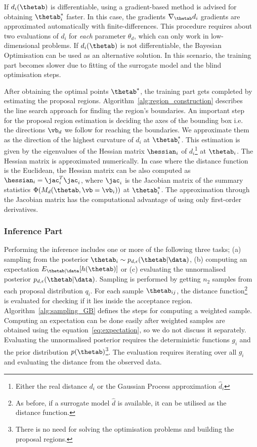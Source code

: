 If $d_i(\thetab)$ is differentiable, using a gradient-based method is
advised for obtaining $\thetab_i^*$ faster. In this case, the
gradients $\nabla_{\thetab} d_i$ gradients are approximated
automatically with finite-differences. This procedure requires about
two evaluations of $d_i$ for \emph{each} parameter $\theta_d$, which
can only work in low-dimensional problems. If $d_i(\thetab)$ is not
differentiable, the Bayesian Optimisation can be used as an
alternative solution. In this scenario, the training part becomes
slower due to fitting of the surrogate model and the blind
optimisation steps.

After obtaining the optimal points $\thetab^*$, the training part gets
completed by estimating the proposal
regions. Algorithm~\ref{alg:region_construction} describes the line
search approach for finding the region's boundaries. An important step
for the proposal region estimation is deciding the axes of the
bounding box i.e. the directions $\vb_d$ we follow for reaching the
boundaries. We approximate them as the direction of the highest
curvature of $d_i$ at $\thetab_i^*$. This estimation is given by the
eigenvalues of the Hessian matrix $\hessian_i$ of
$d_i$\footnote{Either the real distance $d_i$ or the Gaussian Process
  approximation $\hat{d}_i$} at $\thetab_i$. The Hessian matrix is
approximated numerically. In case where the distance function is the
Euclidean, the Hessian matrix can be also computed as
$\hessian_i = \jac_i^T\jac_i$, where $\jac_i$ is the Jacobian matrix
of the summary statistics $\Phi(M_d(\thetab, \vb=\vb_i))$ at
$\thetab_i^*$. The approximation through the Jacobian matrix has the
computational advantage of using only first-order derivatives.

\subsubsection*{Inference Part}
Performing the inference includes one or more of the following three
tasks; (a) sampling from the posterior
$ \thetab_i \sim p_{d, \epsilon}(\thetab|\data)$, (b) computing an
expectation $E_{\thetab|\data}[h(\thetab)]$ or (c) evaluating the
unnormalised posterior $p_{d, \epsilon}(\thetab|\data)$. Sampling is
performed by getting $n_2$ samples from each proposal distribution
$q_i$. For each sample $\thetab_{ij}$, the distance
function\footnote{As before, if a surrogate model $\hat{d}$ is
  available, it can be utilised as the distance function.} is
evaluated for checking if it lies inside the acceptance
region. Algorithm~\ref{alg:sampling_GB} defines the steps for
computing a weighted sample. Computing an expectation can be done
easily after weighted samples are obtained using the
equation~\ref{eq:expectation}, so we do not discuss it
separately. Evaluating the unnormalised posterior requires the
deterministic functions $g_i$ and the prior distribution
$p(\thetab)$\footnote{There is no need for solving the optimisation
  problems and building the proposal regions.}. The evaluation
requires iterating over all $g_i$ and evaluating the distance from the
observed data.

